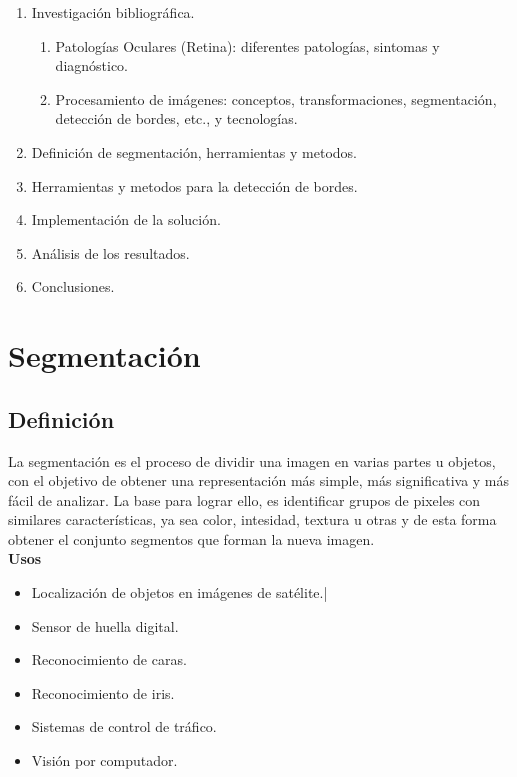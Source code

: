 \documentclass[14pt]{article}
\begin{document}
\begin{enumerate}
	\item Investigación bibliográfica.
		\begin{enumerate}
			\item Patologías Oculares (Retina): diferentes patologías, sintomas y diagnóstico.
			\item Procesamiento de imágenes: conceptos, transformaciones, segmentación, detección de bordes, etc., y tecnologías.
		\end{enumerate}
	\item Definición de segmentación, herramientas y metodos.
	\item Herramientas y metodos para la detección de bordes.
	\item Implementación de la solución.
    \item Análisis de los resultados.
	\item Conclusiones.
\end{enumerate}


\newpage
\section{Segmentación}

\subsection{Definición}

La segmentación es el proceso de dividir una imagen en varias partes u objetos, con el objetivo de obtener una representación más simple, más significativa y más fácil de analizar. La base para lograr ello, es identificar grupos de pixeles con similares características, ya sea color, intesidad, textura u otras y de esta forma obtener el conjunto segmentos que forman la nueva imagen.\\

\textbf{Usos}

\begin{itemize}

\item Localización de objetos en imágenes de satélite.|
\item Sensor de huella digital.
\item Reconocimiento de caras.
\item Reconocimiento de iris.
\item Sistemas de control de tráfico.
\item Visión por computador.

\end{itemize}
\end{document}
